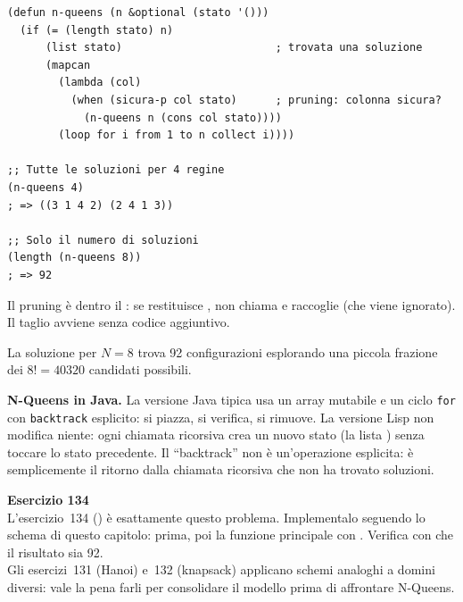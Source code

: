 
\begin{esempio}
\begin{lstlisting}
(defun n-queens (n &optional (stato '()))
  (if (= (length stato) n)
      (list stato)                        ; trovata una soluzione
      (mapcan
        (lambda (col)
          (when (sicura-p col stato)      ; pruning: colonna sicura?
            (n-queens n (cons col stato))))
        (loop for i from 1 to n collect i))))

;; Tutte le soluzioni per 4 regine
(n-queens 4)
; => ((3 1 4 2) (2 4 1 3))

;; Solo il numero di soluzioni
(length (n-queens 8))
; => 92
\end{lstlisting}
\end{esempio}

\begin{nota}
Il pruning è dentro il : se  restituisce ,
 non chiama  e  raccoglie 
(che viene ignorato). Il taglio avviene senza codice aggiuntivo.

\medskip
La soluzione per $N=8$ trova 92 configurazioni esplorando
una piccola frazione dei $8! = 40320$ candidati possibili.
\end{nota}

\begin{confronto}
\textbf{N-Queens in Java.}
La versione Java tipica usa un array mutabile e un ciclo
\texttt{for} con \texttt{backtrack} esplicito:
si piazza, si verifica, si rimuove.
La versione Lisp non modifica niente: ogni chiamata ricorsiva
crea un nuovo stato (la lista ) senza
toccare lo stato precedente.
Il ``backtrack'' non è un'operazione esplicita:
è semplicemente il ritorno dalla chiamata ricorsiva
che non ha trovato soluzioni.
\end{confronto}

\begin{workbook}
\textbf{Esercizio 134}\\[4pt]
L'esercizio~134 () è esattamente questo problema.
Implementalo seguendo lo schema di questo capitolo:
 prima, poi la funzione principale con .
Verifica con  che il risultato sia 92.\\[4pt]
Gli esercizi~131 (Hanoi) e~132 (knapsack) applicano schemi
analoghi a domini diversi: vale la pena farli per consolidare
il modello prima di affrontare N-Queens.
\end{workbook}

